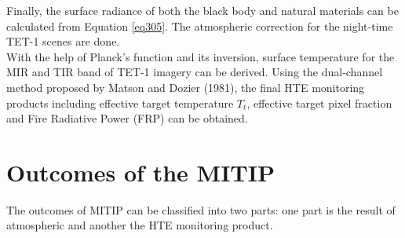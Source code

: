 \noindent Finally, the surface radiance of both the black body and natural materials can be calculated from Equation \eqref{eq305}. The atmospheric correction for the night-time TET-1 scenes are done.\\

\noindent With the help of Planck's function and its inversion, surface temperature for the MIR and TIR band of TET-1 imagery can be derived. Using the dual-channel method proposed by Matson and Dozier (1981), the final HTE monitoring products including effective target temperature $T_t$, effective target pixel fraction and Fire Radiative Power (FRP) can be obtained.\\


\section{Outcomes of the MITIP}
The outcomes of MITIP can be classified into two parts: one part is the result of atmospheric and another the HTE monitoring product.